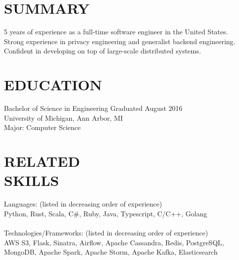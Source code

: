 \documentclass[line,margin]{res}
\begin{document}

\color{HeaderColor}
\address{\hfill riizade@gmail.com -- linkedin.com/in/riizade -- github.com/riizade --  248-716-5054}
\address{\hfill English (native) - Italian (B2) - Japanese (JLPT N2)}


 \renewcommand{\labelitemi}{$-$}

\begin{resume}
\color{black}
\section{\textcolor{HeaderColor}{SUMMARY}}
                5 years of experience as a full-time software engineer in the United States. \\
				Strong experience in privacy engineering and generalist backend engineering. \\
                Confident in developing on top of large-scale distributed systems. \\

\section{\textcolor{HeaderColor}{EDUCATION}} {\sc Bachelor of Science in Engineering} \hfill Graduated August 2016\\
				University of Michigan, Ann Arbor, MI \\
                Major: Computer Science

\section{\textcolor{HeaderColor}{RELATED \\ SKILLS}}
				{\sc Languages: (listed in decreasing order of experience)} \\
				Python, Rust, Scala, C\#, Ruby, Java, Typescript, C/C++, Golang\\
\\
				{\sc Technologies/Frameworks: (listed in decreasing order of experience)} \\
				AWS S3, Flask, Sinatra, Airflow, Apache Cassandra, Redis, PostgreSQL, MongoDB, Apache Spark, Apache Storm, Apache Kafka, Elasticsearch


\end{resume}
\end{document}
